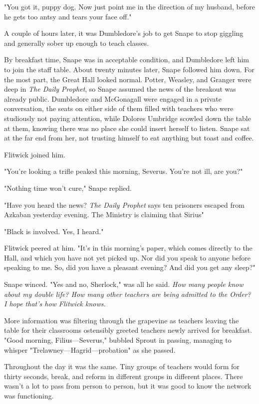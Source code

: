 "You got it, puppy dog. Now just point me in the direction of my husband, before he gets too antsy and tears your face off."

A couple of hours later, it was Dumbledore's job to get Snape to stop giggling and generally sober up enough to teach classes.

\sbreak

By breakfast time, Snape was in acceptable condition, and Dumbledore left him to join the staff table. About twenty minutes later, Snape followed him down. For the most part, the Great Hall looked normal. Potter, Weasley, and Granger were deep in \emph{The Daily Prophet}, so Snape assumed the news of the breakout was already public. Dumbledore and McGonagall were engaged in a private conversation, the seats on either side of them filled with teachers who were studiously not paying attention, while Dolores Umbridge scowled down the table at them, knowing there was no place she could insert herself to listen. Snape sat at the far end from her, not trusting himself to eat anything but toast and coffee.

Flitwick joined him.

"You're looking a trifle peaked this morning, Severus. You're not ill, are you?"

"Nothing time won't cure," Snape replied.

"Have you heard the news? \emph{The Daily Prophet} says ten prisoners escaped from Azkaban yesterday evening. The Ministry is claiming that Sirius{\el}"

"Black is involved. Yes, I heard."

Flitwick peered at him. "It's in this morning's paper, which comes directly to the Hall, and which you have not yet picked up. Nor did you speak to anyone before speaking to me. So, did you have a pleasant evening? And did you get any sleep?"

Snape winced. "Yes and no, Sherlock," was all he said. \emph{How many people know about my double life? How many other teachers are being admitted to the Order? I hope that's how Flitwick knows.}

More information was filtering through the grapevine as teachers leaving the table for their classrooms ostensibly greeted teachers newly arrived for breakfast. "Good morning, Filius—Severus," bubbled Sprout in passing, managing to whisper "Trelawney—Hagrid—probation" as she passed.

Throughout the day it was the same. Tiny groups of teachers would form for thirty seconds, break, and reform in different groups in different places. There wasn't a lot to pass from person to person, but it was good to know the network was functioning.


